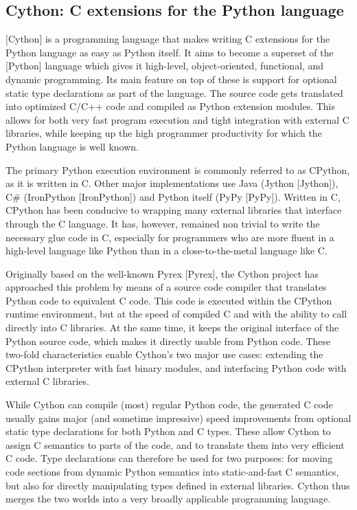 \newpage
\subsection{Cython: C extensions for the Python language}

[Cython] is a programming language that makes writing C extensions for the Python language as easy as Python itself. It aims to become a superset of the [Python] language which gives it high-level, object-oriented, functional, and dynamic programming. Its main feature on top of these is support for optional static type declarations as part of the language. The source code gets translated into optimized C/C++ code and compiled as Python extension modules. This allows for both very fast program execution and tight integration with external C libraries, while keeping up the high programmer productivity for which the Python language is well known.

The primary Python execution environment is commonly referred to as CPython, as it is written in C. Other major implementations use Java (Jython [Jython]), C\# (IronPython [IronPython]) and Python itself (PyPy [PyPy]). Written in C, CPython has been conducive to wrapping many external libraries that interface through the C language. It has, however, remained non trivial to write the necessary glue code in C, especially for programmers who are more fluent in a high-level language like Python than in a close-to-the-metal language like C.

Originally based on the well-known Pyrex [Pyrex], the Cython project has approached this problem by means of a source code compiler that translates Python code to equivalent C code. This code is executed within the CPython runtime environment, but at the speed of compiled C and with the ability to call directly into C libraries. At the same time, it keeps the original interface of the Python source code, which makes it directly usable from Python code. These two-fold characteristics enable Cython’s two major use cases: extending the CPython interpreter with fast binary modules, and interfacing Python code with external C libraries.

While Cython can compile (most) regular Python code, the generated C code usually gains major (and sometime impressive) speed improvements from optional static type declarations for both Python and C types. These allow Cython to assign C semantics to parts of the code, and to translate them into very efficient C code. Type declarations can therefore be used for two purposes: for moving code sections from dynamic Python semantics into static-and-fast C semantics, but also for directly manipulating types defined in external libraries. Cython thus merges the two worlds into a very broadly applicable programming language.



